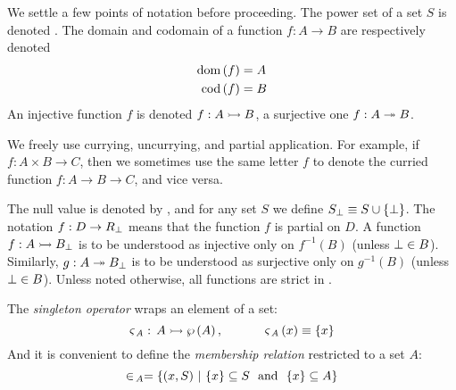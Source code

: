 We settle a few points of notation before proceeding. The power set of
a set $S$ is denoted .  The domain and codomain of a
function $f: A \rightarrow B$ are respectively denoted
\begin{align*}
  \text{dom}\left(f\right) & = A\\
  \text{cod}\left(f\right) & = B
\end{align*}
An injective function $f$ is denoted $f: A \rightarrowtail B$,
a surjective one $f: A \twoheadrightarrow B$.

We freely use currying, uncurrying, and partial application. For
example, if $f: A \times B \rightarrow C$, then we sometimes use the
same letter $f$ to denote the curried function $f: A \rightarrow
B \rightarrow C$, and vice versa.

The null value is denoted by \nothingsym, and for any set $S$ we define
${S}_{\bot} \equiv S \cup \{\bot\}$. The notation $f: D
\rightarrow {R}_{\bot}$ means that the function $f$ is partial on
$D$. A function $f: A \rightarrowtail {B}_{\bot}$ is to be understood as
injective only on $f^{-1}(B)$ (unless $ \bot \in B$). Similarly,
$g: A \twoheadrightarrow {B}_{\bot}$ is to be understood as surjective only on
$g^{-1}(B)$ (unless $\bot \in B$).  Unless noted otherwise, all
functions are strict in \nothingsym.

The {\em singleton operator} wraps an element of a set:
\[ \mathit{\varsigma_{\,A}}: \,A \rightarrowtail \wp\left(A\right), ~~~~~~~~~~
\mathit{\varsigma_{\,A}}\left(x\right) \equiv \{ x \} \]
And it is convenient to define the {\em membership relation}
restricted to a set $A$:
\[ \in_{\,A} = \{ (x, S) ~|~ \{ x \} \subseteq S ~~\text{and}~~ \{
x \} \subseteq A \} \]
